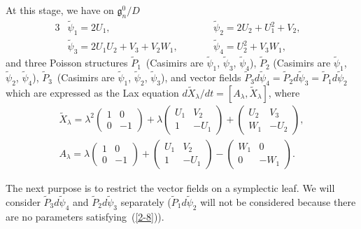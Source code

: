 \documentclass[10pt,a4paper]{amsart}
\numberwithin{equation}{section}
\begin{document}
At this stage, we have on $\mathfrak{g}^0_n/D$
\begin{alignat*}{3}
& \widetilde{\psi}_1 = 2U_1, \qquad && \widetilde{\psi}_2 = 2U_2+U_1^2+V_2, & \\
& \widetilde{\psi}_3 = 2U_1U_2 + V_3 + V_2W_1, \qquad && \widetilde{\psi}_4 = U_2^2 + V_3W_1,&
\end{alignat*}
and three Poisson structures $\widetilde{P}_1$~(Casimirs are $\widetilde{\psi}_1$, $\widetilde{\psi}_3$, $\widetilde{\psi}_4$),
$\widetilde{P}_2$ (Casimirs are $\widetilde{\psi}_1$, $\widetilde{\psi}_2$, $\widetilde{\psi}_4$), $\widetilde{P}_3$~(Casimirs are $\widetilde{\psi}_1$, $\widetilde{\psi}_2$, $\widetilde{\psi}_3$), and vector f\/ields $\widetilde{P}_3d\widetilde{\psi}_4 = \widetilde{P}_2 d\widetilde{\psi}_3 = \widetilde{P}_1d\widetilde{\psi}_2$ which are expressed as the Lax equation $d\widetilde{X}_\lambda /dt = [A_\lambda, \widetilde{X}_\lambda ]$, where
\begin{gather*}
\widetilde{X}_\lambda = \lambda ^2 \left(
\begin{matrix}
1 & 0 \\
0 & -1
\end{matrix}
\right) + \lambda \left(
\begin{matrix}
U_1 & V_2 \\
1 & -U_1
\end{matrix}
\right) + \left(
\begin{matrix}
U_2 & V_3 \\
W_1 & -U_2
\end{matrix}
\right), \\
A_\lambda = \lambda \left(
\begin{matrix}
1 & 0 \\
0 & -1
\end{matrix}
\right) + \left(
\begin{matrix}
U_1 & V_2 \\
1 & -U_1
\end{matrix}
\right) - \left(
\begin{matrix}
W_1 & 0 \\
0 & -W_1
\end{matrix}
\right).
\end{gather*}

The next purpose is to restrict the vector f\/ields on a symplectic leaf. We will consider $\widetilde{P}_3d\widetilde{\psi}_4$ and $\widetilde{P}_2 d\widetilde{\psi}_3$ separately ($\widetilde{P}_1d\widetilde{\psi}_2$ will not be considered because there are no parameters satisfying~(\ref{2-8})).
\end{document}
